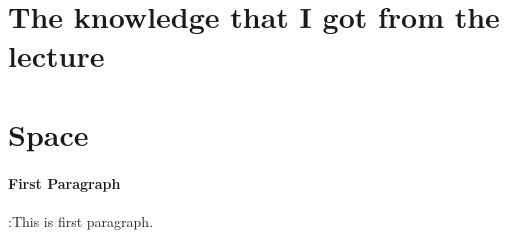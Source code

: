 \section*{The knowledge that I got from the lecture}
\section*{Space}
\paragraph*{First Paragraph}:This is first paragraph\cite{lecture}.\\




